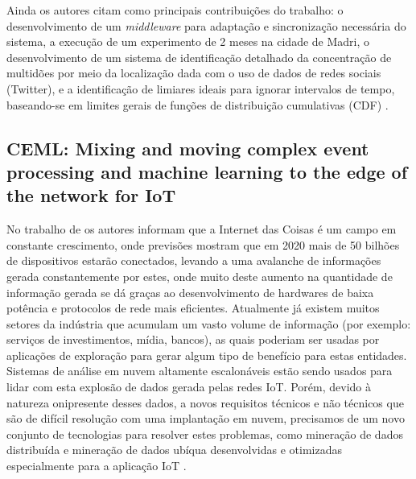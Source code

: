 \documentclass[ti,table]{texufpel} %
\begin{document}
    Ainda os autores citam como principais contribuições do trabalho: o desenvolvimento de um \textit{middleware} para adaptação e sincronização necessária do sistema, a execução de um experimento de 2 meses na cidade de Madri, o desenvolvimento de um sistema de identificação detalhado da concentração  de multidões por meio da localização dada com o uso de dados de redes sociais (Twitter), e a identificação de limiares ideais para ignorar intervalos de tempo, baseando-se em limites gerais de funções de distribuição cumulativas (CDF) \cite{art9kousiouris2018integrated}. 

  

  

  

\subsection{CEML: Mixing and moving complex event processing and machine learning to the edge of the network for IoT} 

  

    No trabalho de \cite{art10soto2016ceml} os autores informam que a Internet das Coisas é um campo em constante crescimento, onde previsões mostram que em 2020 mais de 50 bilhões de dispositivos estarão conectados, levando a uma avalanche de informações gerada constantemente por estes, onde muito deste aumento na quantidade de informação gerada se dá graças ao desenvolvimento de hardwares de baixa potência e protocolos de rede mais eficientes. Atualmente já existem muitos setores da indústria que acumulam um vasto volume de informação (por exemplo: serviços de investimentos, mídia, bancos), as quais poderiam ser usadas por aplicações de exploração para gerar algum tipo de benefício para estas entidades. Sistemas de análise em nuvem altamente escalonáveis estão sendo usados para lidar com esta explosão de dados gerada pelas redes IoT. Porém, devido à natureza onipresente desses dados, a novos requisitos técnicos e não técnicos que são de difícil resolução com uma implantação em nuvem, precisamos de um novo conjunto de tecnologias para resolver estes problemas, como mineração de dados distribuída e mineração de dados ubíqua desenvolvidas e otimizadas especialmente para a aplicação IoT . 

     
\end{document}
